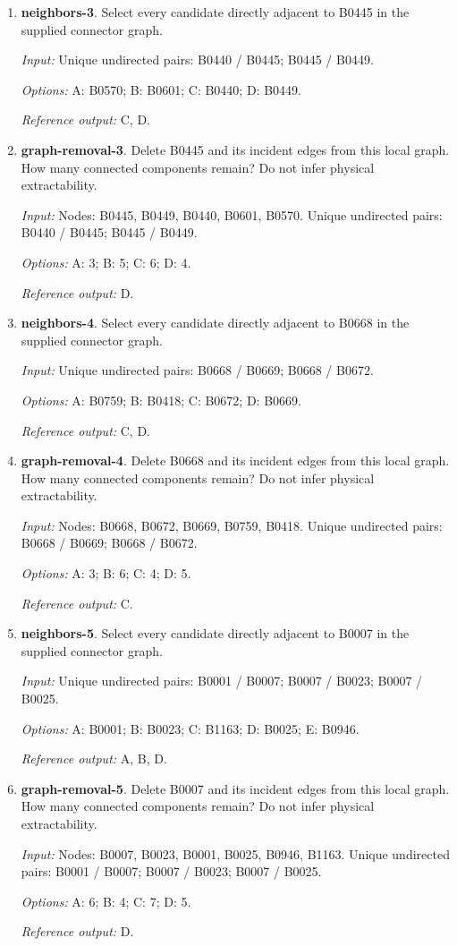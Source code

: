 \begin{enumerate}
\item \textbf{neighbors-3}. Select every candidate directly adjacent to B0445 in the supplied connector graph.\par {\small \textit{Input:} Unique undirected pairs: B0440 / B0445; B0445 / B0449. \par\textit{Options:} A: B0570; B: B0601; C: B0440; D: B0449. \par\textit{Reference output:} C, D.}
\item \textbf{graph-removal-3}. Delete B0445 and its incident edges from this local graph. How many connected components remain? Do not infer physical extractability.\par {\small \textit{Input:} Nodes: B0445, B0449, B0440, B0601, B0570. Unique undirected pairs: B0440 / B0445; B0445 / B0449. \par\textit{Options:} A: 3; B: 5; C: 6; D: 4. \par\textit{Reference output:} D.}
\item \textbf{neighbors-4}. Select every candidate directly adjacent to B0668 in the supplied connector graph.\par {\small \textit{Input:} Unique undirected pairs: B0668 / B0669; B0668 / B0672. \par\textit{Options:} A: B0759; B: B0418; C: B0672; D: B0669. \par\textit{Reference output:} C, D.}
\item \textbf{graph-removal-4}. Delete B0668 and its incident edges from this local graph. How many connected components remain? Do not infer physical extractability.\par {\small \textit{Input:} Nodes: B0668, B0672, B0669, B0759, B0418. Unique undirected pairs: B0668 / B0669; B0668 / B0672. \par\textit{Options:} A: 3; B: 6; C: 4; D: 5. \par\textit{Reference output:} C.}
\item \textbf{neighbors-5}. Select every candidate directly adjacent to B0007 in the supplied connector graph.\par {\small \textit{Input:} Unique undirected pairs: B0001 / B0007; B0007 / B0023; B0007 / B0025. \par\textit{Options:} A: B0001; B: B0023; C: B1163; D: B0025; E: B0946. \par\textit{Reference output:} A, B, D.}
\item \textbf{graph-removal-5}. Delete B0007 and its incident edges from this local graph. How many connected components remain? Do not infer physical extractability.\par {\small \textit{Input:} Nodes: B0007, B0023, B0001, B0025, B0946, B1163. Unique undirected pairs: B0001 / B0007; B0007 / B0023; B0007 / B0025. \par\textit{Options:} A: 6; B: 4; C: 7; D: 5. \par\textit{Reference output:} D.}

\end{enumerate}
